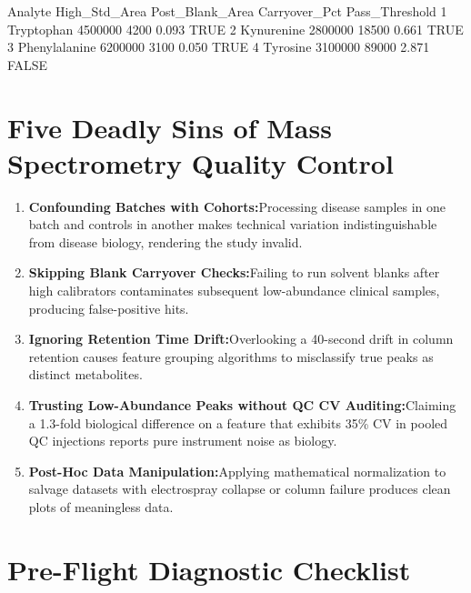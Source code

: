 \documentclass[11pt,twoside,openright]{book}
\begin{document}
\begin{routput}
        Analyte High\_Std\_Area Post\_Blank\_Area Carryover\_Pct Pass\_Threshold
1    Tryptophan       4500000            4200         0.093           TRUE
2    Kynurenine       2800000           18500         0.661           TRUE
3 Phenylalanine       6200000            3100         0.050           TRUE
4      Tyrosine       3100000           89000         2.871          FALSE
\end{routput}

\section{Five Deadly Sins of Mass Spectrometry Quality Control}
\label{sec:deadly_sins}

\begin{enumerate}
    \item \textbf{Confounding Batches with Cohorts:}\enspace Processing disease samples in one batch and controls in another makes technical variation indistinguishable from disease biology, rendering the study invalid.
    \item \textbf{Skipping Blank Carryover Checks:}\enspace Failing to run solvent blanks after high calibrators contaminates subsequent low-abundance clinical samples, producing false-positive hits.
    \item \textbf{Ignoring Retention Time Drift:}\enspace Overlooking a 40-second drift in column retention causes feature grouping algorithms to misclassify true peaks as distinct metabolites.
    \item \textbf{Trusting Low-Abundance Peaks without QC CV Auditing:}\enspace Claiming a 1.3-fold biological difference on a feature that exhibits 35\% CV in pooled QC injections reports pure instrument noise as biology.
    \item \textbf{Post-Hoc Data Manipulation:}\enspace Applying mathematical normalization to salvage datasets with electrospray collapse or column failure produces clean plots of meaningless data.
\end{enumerate}

\section{Pre-Flight Diagnostic Checklist}
\label{sec:diagnostic_checklist}
\end{document}
